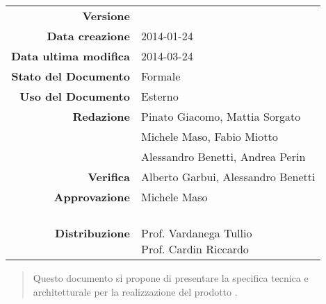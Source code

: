 


\newcommand{\Versione}{\versioneSpecificaTecnica{}}	  %
\newcommand{\Data}{2014-01-24}				           %
\newcommand{\DataUltimaModifica}{2014-03-24}
\newcommand{\TipoDocumento}{Specifica Tecnica}	       %



\begin{center}
\begin{tabular}{r|l}
\textbf{Versione} & \Versione{} \\
\textbf{Data creazione} & \Data{} \\
\textbf{Data ultima modifica} & \DataUltimaModifica{} \\
\textbf{Stato del Documento} & Formale \\		          %
\textbf{Uso del Documento} & Esterno \\			          %
\textbf{Redazione} &  Pinato Giacomo, Mattia Sorgato\\	  %
& Michele Maso, Fabio Miotto\\
& Alessandro Benetti, Andrea Perin\\
\textbf{Verifica} & Alberto Garbui, Alessandro Benetti\\  %
\textbf{Approvazione} & Michele Maso\\				      %
\textbf{Distribuzione} & \parbox[t]{4cm}{\NomeGruppo{}\\Prof. Vardanega Tullio\\Prof. Cardin Riccardo\\ \Prop{} }\\
\end{tabular}
\end{center}

\vspace{0.05in}

\begin{abstract}
\begin{center}
Questo documento si propone di presentare la specifica tecnica e architetturale per la realizzazione del prodotto \Progetto{}.
\end{center}
\end{abstract}

